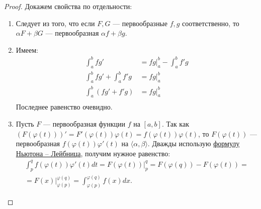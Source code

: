 \begin{proof}
	Докажем свойства по отдельности:
	\begin{enumerate}
		\item Следует из того, что если $F, G$ --- первообразные $f, g$ соответственно,
		то $\alpha F + \beta G$ --- первообразная $\alpha f + \beta g$.
		\item Имеем:
		\begin{align*}
			\int_a^b fg' &= fg \bigg|_a^b - \int_a^b f'g \\
			\int_a^b fg' + \int_a^b f'g &= fg \bigg|_a^b \\
			\int_a^b (fg' + f'g) &= fg \bigg|_a^b		   \\
		\end{align*}
		Последнее равенство очевидно.
		\item Пусть $F$ --- первообразная функции $f$ на $[a, b]$. Так как \\ 
		\hbox{$(F(\varphi(t)))' = F'(\varphi(t)) \varphi(t) = f(\varphi(t)) \varphi(t)$}, то
		$F(\varphi(t))$ --- первообразная $f(\varphi(t)) \varphi'(t)$ на $\langle \alpha, \beta \rangle$.
		Дважды использую \hyperlink{t9}{формулу Ньютона -- Лейбница}, получим нужное равенство:
		\begin{multline*}
	 		\int_p^q f(\varphi(t))\varphi'(t) dt = F(\varphi(t)) \bigg|_p^q = F(\varphi(q)) - F(\varphi(t)) = \\
			= F(x) \bigg|_{\varphi(p)}^{\varphi(q)} = \int_{\varphi(p)}^{\varphi(q)} f(x) dx.
		\end{multline*}
	\end{enumerate}
\end{proof}

